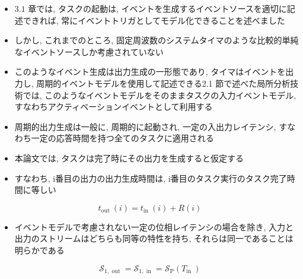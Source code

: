 \begin{frame}{}
    \begin{itemize}
        \item $3.1$ 章では, タスクの起動は, イベントを生成するイベントソースを適切に記述できれば, 常にイベントトリガとしてモデル化できることを述べました
        \item しかし, これまでのところ, 固定周波数のシステムタイマのような比較的単純なイベントソースしか考慮されていない
        \item このようなイベント生成は出力生成の一形態であり, タイマはイベントを出力し, 周期的イベントモデルを使用して記述できる2.1 節で述べた局所分析技術では, このようなイベントモデルをそのままタスクの入力イベントモデル, すなわちアクティベーションイベントとして利用する
    \end{itemize}
\end{frame}

\begin{frame}{}
    \begin{itemize}
        \item 周期的出力生成は一般に, 周期的に起動され, 一定の入出力レイテンシ, すなわち一定の応答時間を持つ全てのタスクに適用される
        \item 本論文では, タスクは完了時にその出力を生成すると仮定する
        \item すなわち, i番目の出力の出力生成時間は, i番目のタスク実行のタスク完了時間に等しい

    \end{itemize}
    \begin{equation*}
        t_{\text {out }}(i)=t_{\text {in }}(i)+R(i)
    \end{equation*}
\end{frame}

\begin{frame}{}
\end{frame}

\begin{frame}{}
    \begin{itemize}
        \item イベントモデルで考慮されない一定の位相レイテンシの場合を除き, 入力と出力のストリームはどちらも同等の特性を持ち, それらは同一であることは明らかである

    \end{itemize}
    \begin{equation*}
        \mathcal{S}_{1, \text { out }}=\mathcal{S}_{1, \text { in }}=\mathcal{S}_{\mathrm{P}}\left(T_{\text {in }}\right)
    \end{equation*}
\end{frame}

